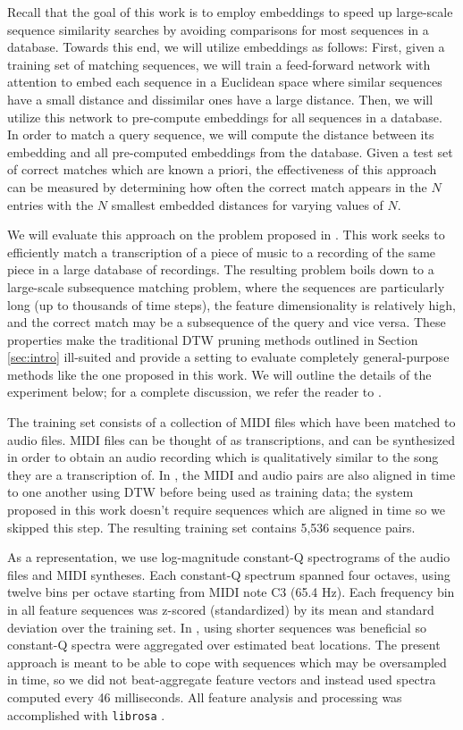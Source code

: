 \documentclass{article}
\begin{document}
Recall that the goal of this work is to employ embeddings to speed up large-scale sequence similarity searches by avoiding comparisons for most sequences in a database.
Towards this end, we will utilize embeddings as follows:
First, given a training set of matching sequences, we will train a feed-forward network with attention to embed each sequence in a Euclidean space where similar sequences have a small distance and dissimilar ones have a large distance.
Then, we will utilize this network to pre-compute embeddings for all sequences in a database.
In order to match a query sequence, we will compute the distance between its embedding and all pre-computed embeddings from the database.
Given a test set of correct matches which are known a priori, the effectiveness of this approach can be measured by determining how often the correct match appears in the $N$ entries with the $N$ smallest embedded distances for varying values of $N$.

We will evaluate this approach on the problem proposed in \cite{raffel2015large}.
This work seeks to efficiently match a transcription of a piece of music to a recording of the same piece in a large database of recordings.
The resulting problem boils down to a large-scale subsequence matching problem, where the sequences are particularly long (up to thousands of time steps), the feature dimensionality is relatively high, and the correct match may be a subsequence of the query and vice versa.
These properties make the traditional DTW pruning methods outlined in Section \ref{sec:intro} ill-suited and provide a setting to evaluate completely general-purpose methods like the one proposed in this work.
We will outline the details of the experiment below; for a complete discussion, we refer the reader to \cite{raffel2015large}.

The training set consists of a collection of MIDI files which have been matched to audio files.
MIDI files can be thought of as transcriptions, and can be synthesized in order to obtain an audio recording which is qualitatively similar to the song they are a transcription of.
In \cite{raffel2015large}, the MIDI and audio pairs are also aligned in time to one another using DTW before being used as training data; the system proposed in this work doesn't require sequences which are aligned in time so we skipped this step.
The resulting training set contains 5,536 sequence pairs.

As a representation, we use log-magnitude constant-Q spectrograms \cite{brown1991calculation} of the audio files and MIDI syntheses.
Each constant-Q spectrum spanned four octaves, using twelve bins per octave starting from MIDI note C3 (65.4 Hz).
Each frequency bin in all feature sequences was z-scored (standardized) by its mean and standard deviation over the training set.
In \cite{raffel2015large}, using shorter sequences was beneficial so constant-Q spectra were aggregated over estimated beat locations.
The present approach is meant to be able to cope with sequences which may be oversampled in time, so we did not beat-aggregate feature vectors and instead used spectra computed every 46 milliseconds.
All feature analysis and processing was accomplished with \texttt{librosa} \cite{mcfee2015librosa, mcfee2015librosa_scipy}.
\end{document}
